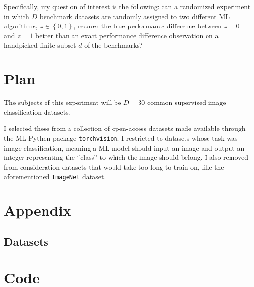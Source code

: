 \documentclass[11pt, oneside]{article}
\newcommand{\dataset}[2]{
    \href{#2}{\texttt{#1}}
}
\newcommand{\ImageNet}{\dataset{ImageNet}{https://www.image-net.org/about.php}}
\begin{document}
Specifically, my question of interest is the following: can a randomized
experiment in which $D$ benchmark datasets are randomly assigned to two
different ML algorithms, $z \in \left\{ 0, 1 \right\}$, recover the true
performance difference between $z = 0$ and $z = 1$ better than an exact
performance difference observation on a handpicked finite subset $d$ of the
benchmarks?

\section*{Plan}

The subjects of this experiment will be $D = 30$ common supervised image classification
datasets.

I selected these from a collection of open-access datasets made available
through the ML Python package \texttt{torchvision}. I restricted to datasets
whose task was image classification, meaning a ML model should input an image
and output an integer representing the ``class'' to which the image should
belong. I also removed from consideration datasets that would take too long to
train on, like the aforementioned \ImageNet dataset.


\newpage

\section*{Appendix}

\subsection*{Datasets}




\newpage

\section*{Code}
\end{document}

